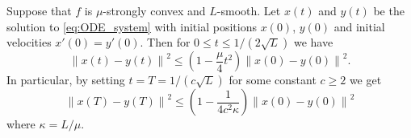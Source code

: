\documentclass{toc}
\newcommand{\norm}[1]{\left\lVert #1 \right\rVert}
\begin{document}
\begin{lemma}
	\label{lem:HMC_contraction}
	Suppose that $f$ is $\mu$-strongly convex and $L$-smooth. Let $x(t)$ and $y(t)$ be the solution to \eqref{eq:ODE_system} with initial positions $x(0)$, $y(0)$ and initial velocities $x'(0) = y'(0)$. Then for $0\le t \le 1/(2\sqrt{L})$ we have
	\begin{equation}
	\norm{x(t) - y(t)}^2 \le \left( 1 - \frac{\mu}{4} t^2 \right) \norm{x(0) - y(0)}^2.
	\end{equation}
	In particular, by setting $t = T = 1/(c\sqrt{L})$ for some constant $c \ge 2$ we get
	\begin{equation}
	\norm{x(T) - y(T)}^2 \le \left( 1 - \frac{1}{4c^2 \kappa} \right) \norm{x(0) - y(0)}^2
	\end{equation}
	where $\kappa = L/\mu$.
\end{lemma}
\end{document}
